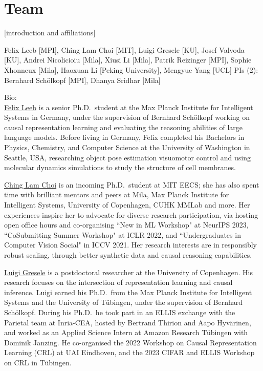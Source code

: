 \documentclass{article}
\begin{document}
% 





\section{Team}

[introduction and affiliations]

Felix Leeb [MPI], Ching Lam Choi [MIT], Luigi Gresele [KU], Josef Valvoda [KU],  Andrei Nicolicioiu [Mila], Xiusi Li [Mila], Patrik Reizinger [MPI], Sophie Xhonneux [Mila],
Haoxuan Li [Peking University], Mengyue Yang [UCL]
PIs (2): Bernhard Schölkopf [MPI], Dhanya Sridhar [Mila]

Bio:\\

\href{https://felixludos.com/}{Felix Leeb} 
is a senior Ph.D.\ student at the Max Planck Institute for Intelligent Systems in Germany, under the supervision of Bernhard Schölkopf working on causal representation learning and evaluating the reasoning abilities of large language models. Before living in Germany, Felix completed his Bachelors in Physics, Chemistry, and Computer Science at the University of Washington in Seattle, USA, researching object pose estimation visuomotor control and using molecular dynamics simulations to study the structure of cell membranes.

\href{https://chinglamchoi.github.io/cchoi/}{Ching Lam Choi} is an incoming Ph.D.\ student at MIT EECS; she has also spent time with brilliant mentors and peers at Mila, Max Planck Institute for Intelligent Systems, University of Copenhagen, CUHK MMLab and more. Her experiences inspire her to advocate for diverse research participation, via hosting open office hours and co-organising ``New in ML Workshop" at NeurIPS 2023, ``CoSubmitting Summer Workshop" at ICLR 2022, and ``Undergraduates in Computer Vision Social" in ICCV 2021. Her research interests are in responsibly robust scaling, through better synthetic data and causal reasoning capabilities.

\href{https://lgresele.github.io/}{Luigi Gresele}  is a postdoctoral researcher at the University of Copenhagen. His research focuses on the intersection of representation learning and causal inference. Luigi earned his Ph.D.\ from the Max Planck Institute for Intelligent Systems and the University of Tübingen, under the supervision of Bernhard Schölkopf. During his Ph.D.\, he took part in an ELLIS exchange with the Parietal team at Inria-CEA, hosted by Bertrand Thirion and Aapo Hyvärinen, and worked as an Applied Science Intern at Amazon Research Tübingen with Dominik Janzing. He co-organised the 2022 Workshop on Causal Representation Learning (CRL) at UAI Eindhoven, and the 2023 CIFAR and ELLIS Workshop on CRL in T\"ubingen.
\end{document}
